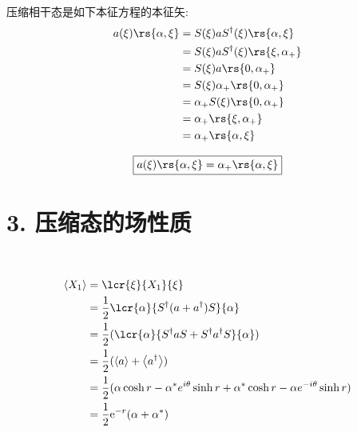     \begin{frame}
          \frametitle{}
          
    压缩相干态是如下本征方程的本征矢: 
    \[\begin{aligned}
        a(\xi) \rs{\alpha, \xi} &= S(\xi) a S ^\dagger (\xi) \rs{\alpha, \xi}  \\ 
        &= S(\xi) a S ^\dagger (\xi) \rs{\xi, \alpha_{+}}  \\ 
        &= S (\xi)  a  \rs{0, \alpha_{+}} \\ 
        &= S (\xi) \alpha_{+}  \rs{0, \alpha_{+}} \\ 
        &= \alpha_{+} S (\xi)  \rs{0, \alpha_{+}} \\ 
        &= \alpha_{+}  \rs{\xi, \alpha_{+}} \\ 
        &= \alpha_{+}  \rs{\alpha, \xi}  
    \end{aligned} \]

    \[  \boxed{a(\xi) \rs{\alpha, \xi}= \alpha_{+}  \rs{\alpha, \xi}}\]
   
   \end{frame}

\section{3. 压缩态的场性质}

\begin{frame}
 \frametitle{}
 \例 [4.试计算压缩态场的正交分量算符的量子涨落 ]{
    \[ \Delta X_1 \Delta X_2 =\dfrac{1}{4}, \qquad  \Delta X_1 = \frac{1}{2} e^{-r} < \frac{1}{2}, \, \Delta X_2 = \frac{1}{2} e^r > \frac{1}{2}, (\text{for} \quad r>0)\]}
    \解~  
    \[\begin{aligned}
        \left\langle X_1 \right\rangle &= \lcr {\xi} {X_1} {\xi}\\
        &= \frac{1}{2}\lcr {\alpha} {S^\dagger(a+ a^{\dagger})S } {\alpha}\\
        &= \frac{1}{2}(\lcr {\alpha} {S^\dagger a S + S^\dagger a^{\dagger}S } {\alpha} )  \\ 
        &= \frac{1}{2}(\left\langle a \right\rangle + \left\langle a^\dagger \right\rangle)  \\ 
        &= \frac{1}{2}( \alpha \cosh r- \alpha^{*}  e^{i\theta}\sinh r + \alpha^{*} \cosh r -\alpha  e^{-i\theta}\sinh r ) \\ 
        &= \frac{1}{2} \mathrm{e}^{-r} (\alpha + \alpha^*)  
    \end{aligned} \]
\end{frame}

